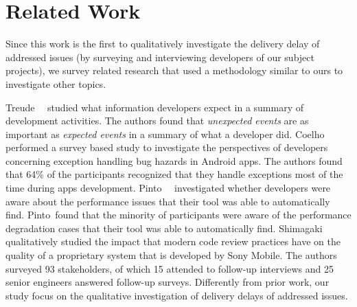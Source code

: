 \section{Related Work} \label{ch6:relatedwork}

Since this work is the first to qualitatively investigate the delivery delay of
addressed issues (\ie by surveying and interviewing developers of our subject
projects), we survey related research that used a methodology similar to ours to
investigate other topics.

Treude~\etal~\cite{treude2015summarizing} studied what information developers
expect in a summary of development activities. The authors found that {\em
unexpected events} are as important as {\em expected events} in a summary of
what a developer did.  Coelho~\etal~\cite{coelho2016exception} performed a
survey based study to investigate the perspectives of developers concerning
exception handling bug hazards in Android apps. The authors found that 64\% of
the participants recognized that they handle exceptions most of the time during
apps development.  Pinto~\etal~\cite{pinto2015automating} investigated whether
developers were aware about the performance issues that their tool was able to
automatically find. Pinto~\etal found that the minority of participants were
aware of the performance degradation cases that their tool was able to
automatically find.  Shimagaki~\etal~\cite{shimagaki2016study} qualitatively
studied the impact that modern code review practices have on the quality of a
proprietary system that is developed by Sony Mobile. The authors surveyed 93
stakeholders, of which 15 attended to follow-up interviews and 25 senior
engineers answered follow-up surveys. Differently from prior work, our study
focus on the qualitative investigation of delivery delays of addressed issues.

